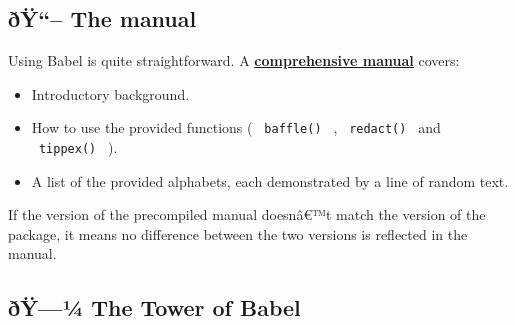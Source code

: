 \begin{Shaded}
\begin{Highlighting}[]



\end{Highlighting}
\end{Shaded}


\subsection{ðŸ``-- The manual}\label{uxf0uxff-the-manual}

Using { Babel } is quite straightforward. A
\href{https://github.com/typst/packages/raw/main/packages/preview/babel/0.1.1/docs/manual.pdf}{\textbf{comprehensive
manual}} covers:

\begin{itemize}
\tightlist
\item
  Introductory background.
\item
  How to use the provided functions ( \texttt{\ baffle()\ } ,
  \texttt{\ redact()\ } and \texttt{\ tippex()\ } ).
\item
  A list of the provided alphabets, each demonstrated by a line of
  random text.
\end{itemize}

If the version of the precompiled manual doesnâ€™t match the version of
the package, it means no difference between the two versions is
reflected in the manual.

\subsection{\texorpdfstring{ðŸ---¼ The Tower of { Babel
}}{ðŸ---¼ The Tower of  Babel }}\label{uxf0uxffuxbc-the-tower-of-babel}

